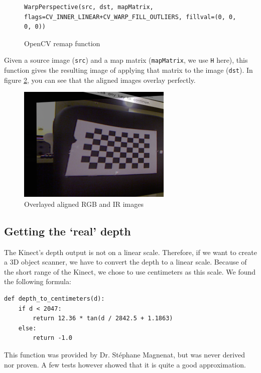 \begin{figure}[H]
\begin{lstlisting}
WarpPerspective(src, dst, mapMatrix, flags=CV_INNER_LINEAR+CV_WARP_FILL_OUTLIERS, fillval=(0, 0, 0, 0))
\end{lstlisting}
\caption{OpenCV remap function}
\label{code:warpperspective}
\end{figure}

Given a source image (\verb|src|) and a map matrix (\verb|mapMatrix|, we use \verb|H| here), this function gives the resulting image of applying that matrix to the image (\verb|dst|). In figure \ref{fig:aligned}, you can see that the aligned images overlay perfectly.

\begin{figure}[H]
\centering
\includegraphics[scale=0.6]{images/aligned.png}
\caption{Overlayed aligned RGB and IR images}
\label{fig:aligned}
\end{figure}


\subsection{Getting the `real' depth}
The Kinect's depth output is not on a linear scale. Therefore, if we want to create a 3D object scanner, we have to convert the depth to a linear scale. Because of the short range of the Kinect, we chose to use centimeters as this scale. We found the following formula:

\begin{lstlisting}
def depth_to_centimeters(d):
    if d < 2047:
        return 12.36 * tan(d / 2842.5 + 1.1863)
    else:
        return -1.0
\end{lstlisting}
This function was provided by Dr. St\'ephane Magnenat, but was never derived nor proven. A few tests however showed that it is quite a good approximation.


